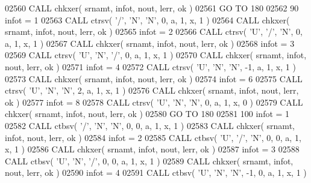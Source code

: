 \begin{DoxyCode}
02560       \textcolor{keyword}{CALL }chkxer( srnamt, infot, nout, lerr, ok )
02561       \textcolor{keywordflow}{GO TO} 180
02562    90 infot = 1
02563       \textcolor{keyword}{CALL }ctrsv( \textcolor{stringliteral}{'/'}, \textcolor{stringliteral}{'N'}, \textcolor{stringliteral}{'N'}, 0, a, 1, x, 1 )
02564       \textcolor{keyword}{CALL }chkxer( srnamt, infot, nout, lerr, ok )
02565       infot = 2
02566       \textcolor{keyword}{CALL }ctrsv( \textcolor{stringliteral}{'U'}, \textcolor{stringliteral}{'/'}, \textcolor{stringliteral}{'N'}, 0, a, 1, x, 1 )
02567       \textcolor{keyword}{CALL }chkxer( srnamt, infot, nout, lerr, ok )
02568       infot = 3
02569       \textcolor{keyword}{CALL }ctrsv( \textcolor{stringliteral}{'U'}, \textcolor{stringliteral}{'N'}, \textcolor{stringliteral}{'/'}, 0, a, 1, x, 1 )
02570       \textcolor{keyword}{CALL }chkxer( srnamt, infot, nout, lerr, ok )
02571       infot = 4
02572       \textcolor{keyword}{CALL }ctrsv( \textcolor{stringliteral}{'U'}, \textcolor{stringliteral}{'N'}, \textcolor{stringliteral}{'N'}, -1, a, 1, x, 1 )
02573       \textcolor{keyword}{CALL }chkxer( srnamt, infot, nout, lerr, ok )
02574       infot = 6
02575       \textcolor{keyword}{CALL }ctrsv( \textcolor{stringliteral}{'U'}, \textcolor{stringliteral}{'N'}, \textcolor{stringliteral}{'N'}, 2, a, 1, x, 1 )
02576       \textcolor{keyword}{CALL }chkxer( srnamt, infot, nout, lerr, ok )
02577       infot = 8
02578       \textcolor{keyword}{CALL }ctrsv( \textcolor{stringliteral}{'U'}, \textcolor{stringliteral}{'N'}, \textcolor{stringliteral}{'N'}, 0, a, 1, x, 0 )
02579       \textcolor{keyword}{CALL }chkxer( srnamt, infot, nout, lerr, ok )
02580       \textcolor{keywordflow}{GO TO} 180
02581   100 infot = 1
02582       \textcolor{keyword}{CALL }ctbsv( \textcolor{stringliteral}{'/'}, \textcolor{stringliteral}{'N'}, \textcolor{stringliteral}{'N'}, 0, 0, a, 1, x, 1 )
02583       \textcolor{keyword}{CALL }chkxer( srnamt, infot, nout, lerr, ok )
02584       infot = 2
02585       \textcolor{keyword}{CALL }ctbsv( \textcolor{stringliteral}{'U'}, \textcolor{stringliteral}{'/'}, \textcolor{stringliteral}{'N'}, 0, 0, a, 1, x, 1 )
02586       \textcolor{keyword}{CALL }chkxer( srnamt, infot, nout, lerr, ok )
02587       infot = 3
02588       \textcolor{keyword}{CALL }ctbsv( \textcolor{stringliteral}{'U'}, \textcolor{stringliteral}{'N'}, \textcolor{stringliteral}{'/'}, 0, 0, a, 1, x, 1 )
02589       \textcolor{keyword}{CALL }chkxer( srnamt, infot, nout, lerr, ok )
02590       infot = 4
02591       \textcolor{keyword}{CALL }ctbsv( \textcolor{stringliteral}{'U'}, \textcolor{stringliteral}{'N'}, \textcolor{stringliteral}{'N'}, -1, 0, a, 1, x, 1 )

\end{DoxyCode}
